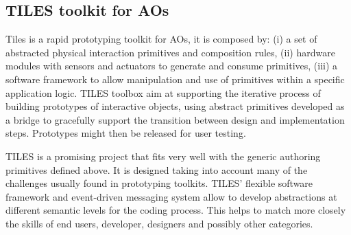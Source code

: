 \subsection{TILES toolkit for AOs}
Tiles is a rapid prototyping toolkit for AOs, it is composed by: (i) a set of abstracted physical interaction primitives and composition rules, (ii) hardware modules with sensors and actuators to generate and consume primitives, (iii) a software framework to allow manipulation and use of primitives within a specific application logic. TILES toolbox aim at supporting the iterative process of building prototypes of interactive objects, using abstract primitives developed as a bridge to gracefully support the transition between design and implementation steps. Prototypes might then be released for user testing.

TILES is a promising project that fits very well with the generic authoring primitives defined above. It is designed taking into account many of the challenges usually found in prototyping toolkits.
TILES' flexible software framework and event-driven messaging system allow to develop abstractions at different semantic levels for the coding process. This helps to match more closely the skills of end users, developer, designers and possibly other categories.